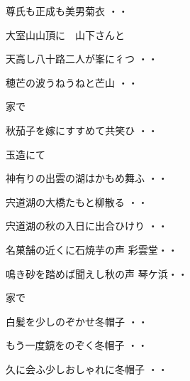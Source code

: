 \begin{shiika}尊氏も正成も美男菊衣
\hfill{・・}\end{shiika}
\vspace{0.6cm}
大室山山頂に　山下さんと
\begin{shiika}天高し八十路二人が峯に彳つ
\hfill{・・}\end{shiika}
\begin{shiika}穂芒の波うねうねと芒山
\hfill{・・}\end{shiika}
\vspace{0.6cm}
家で
\begin{shiika}秋茄子を嫁にすすめて共笑ひ
\hfill{・・}\end{shiika}
\vspace{0.6cm}
玉造にて
\begin{shiika}神有りの出雲の湖はかもめ舞ふ
\hfill{・・}\end{shiika}
\begin{shiika}宍道湖の大橋たもと柳散る
\hfill{・・}\end{shiika}
\begin{shiika}宍道湖の秋の入日に出合ひけり
\hfill{・・}\end{shiika}
\begin{shiika}名菓舗の近くに石焼芋の声
彩雲堂\hfill{・・}\end{shiika}
\begin{shiika}鳴き砂を踏めば聞えし秋の声
琴ケ浜\hfill{・・}\end{shiika}
\vspace{0.6cm}
家で
\begin{shiika}白髪を少しのぞかせ冬帽子
\hfill{・・}\end{shiika}
\vspace{0.6cm}
\begin{shiika}もう一度鏡をのぞく冬帽子
\hfill{・・}\end{shiika}
\vspace{0.6cm}
\begin{shiika}久に会ふ少しおしゃれに冬帽子
\hfill{・・}\end{shiika}
\vspace{0.6cm}
